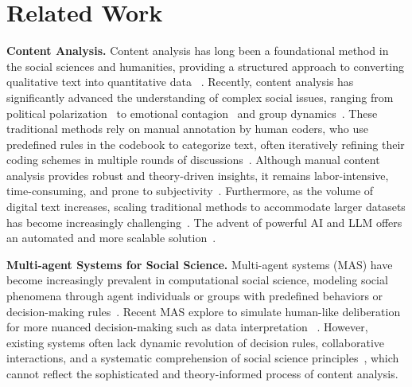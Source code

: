 \section{Related Work}
\textbf{Content Analysis.} Content analysis has long been a foundational method in the social sciences and humanities, providing a structured approach to converting qualitative text into quantitative data ~\citep{krippendorff2018content,neuendorf2017content,riffe2023analyzing}. Recently, content analysis has significantly advanced the understanding of complex social issues, ranging from political polarization~\citep{conover2011political} to emotional contagion~\citep{kramer2014experimental} and group dynamics~\citep{holsti1969content}. These traditional methods rely on manual annotation by human coders, who use predefined rules in the codebook to categorize text, often iteratively refining their coding schemes in multiple rounds of discussions~\citep{riffe2023analyzing}. Although manual content analysis provides robust and theory-driven insights, it remains labor-intensive, time-consuming, and prone to subjectivity~\citep{hopkins2010method}. Furthermore, as the volume of digital text increases, scaling traditional methods to accommodate larger datasets has become increasingly challenging~\citep{zhao2024automated}. The advent of powerful AI and LLM offers an automated and more scalable solution~\citep{eloundou2023gpts,achiam2023gpt,li2024generation}.

\noindent\textbf{Multi-agent Systems for Social Science.} Multi-agent systems (MAS) have become increasingly prevalent in computational social science, modeling social phenomena through agent individuals or groups with predefined behaviors or decision-making rules~\citep{van2008multi,chen2021application,chmura2007extended,macal2016everything,lee2018generating,chen2018dynamic,dehkordi2023using,uhrmacher2018multi}. Recent MAS explore to simulate human-like deliberation for more nuanced decision-making such as data interpretation ~\citep{gurcan2024llm,turgut2023framework}. However, existing systems often lack dynamic revolution of decision rules, collaborative interactions, and a systematic comprehension of social science principles~\citep{gheyle2017content}, which cannot reflect the sophisticated and theory-informed process of content analysis.

